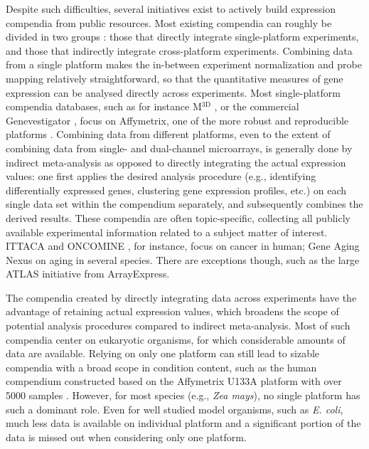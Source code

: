 Despite such difficulties, several initiatives exist to actively build
expression compendia from public resources.
%
Most existing compendia can roughly be divided in two groups \cite{Fierro2008}:
those that directly integrate single-platform experiments, and those that
indirectly integrate cross-platform experiments.
%
Combining data from a single platform makes the in-between experiment
normalization and probe mapping relatively straightforward, so that the
quantitative measures of gene expression can be analysed directly across
experiments.
%
Most single-platform compendia databases, such as for instance
M$^{\textrm{3D}}$ \cite{Faith2008}, or the commercial Genevestigator
\cite{Hruz2008}, focus on Affymetrix, one of the more robust and reproducible
platforms \cite{Bammler2005, Irizarry2005}.
%
Combining data from different platforms, even to the extent of combining data
from single- and dual-channel microarrays, is generally done by indirect
meta-analysis as opposed to directly integrating the actual expression values:
one first applies the desired analysis procedure (e.g., identifying
differentially expressed genes, clustering gene expression profiles, etc.) on
each single data set within the compendium separately, and subsequently
combines the derived results.
%
These compendia are often topic-specific, collecting all publicly available
experimental information related to a subject matter of interest.  ITTACA
\cite{Elfilali2006} and ONCOMINE \cite{Rhodes2007}, for instance, focus on
cancer in human; Gene Aging Nexus \cite{Pan2007} on aging in several species.
%
There are exceptions though, such as the large ATLAS \cite{Kapushesky2010}
initiative from ArrayExpress.


The compendia created by directly integrating data across experiments have the
advantage of retaining actual expression values, which broadens the scope of
potential analysis procedures compared to indirect meta-analysis.
%
Most of such compendia center on eukaryotic organisms, for which considerable
amounts of data are available.
%
Relying on only one platform can still lead to sizable compendia with a broad
scope in condition content, such as the human compendium constructed based on
the Affymetrix U133A platform with over 5000 samples \cite{Lukk2010}.  However,
for most species (e.g., \textit{Zea mays}), no single platform has such a
dominant role.
%
%
Even for well studied model organisms, such as {\it E. coli}, much
less data is available on individual platform and a significant
portion of the data is missed out when considering only one platform.


